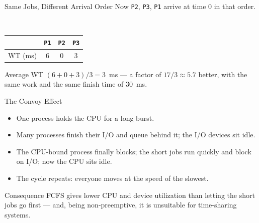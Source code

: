 \documentclass[aspectratio=169]{beamer}
\begin{document}
\begin{frame}{Same Jobs, Different Arrival Order}
  \centering
  \footnotesize
  Now \texttt{P2}, \texttt{P3}, \texttt{P1} arrive at time 0 in that order.\\[0.25cm]
  \\[0.25cm]
  \begin{tabular}{lccc}
    \toprule
    & \texttt{P1} & \texttt{P2} & \texttt{P3} \\
    \midrule
    WT (ms) & 6 & 0 & 3 \\
    \bottomrule
  \end{tabular}
  \vspace{0.2cm}
  \begin{exampleblock}{Average WT}
    $(6 + 0 + 3)/3 = 3$~ms --- a factor of $17/3 \approx 5.7$ better, with
    the same work and the same finish time of 30~ms.
  \end{exampleblock}
\end{frame}

\begin{frame}{The Convoy Effect}
  \begin{itemize}
    \item One  process holds the CPU for a long burst.
    \item Many  processes finish their I/O and queue behind
      it; the I/O devices sit idle.
    \item The CPU-bound process finally blocks; the short jobs run quickly
      and block on I/O; now the CPU sits idle.
    \item The cycle repeats: everyone moves at the speed of the slowest.
  \end{itemize}
  \vspace{0.2cm}
  \begin{alertblock}{Consequence}
    FCFS gives lower CPU and device utilization than letting the short jobs
    go first --- and, being non-preemptive, it is unsuitable for time-sharing
    systems.
  \end{alertblock}
\end{frame}
\end{document}
